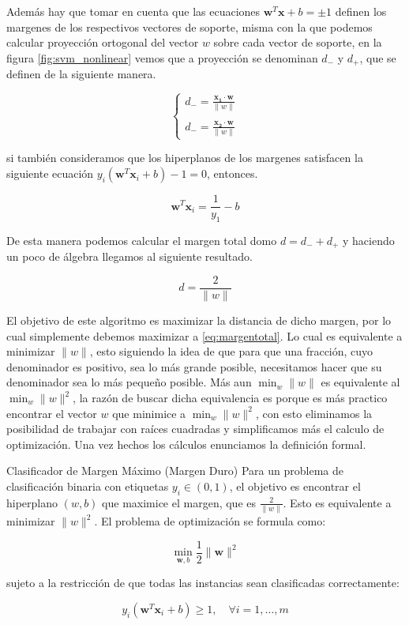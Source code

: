 Además hay que tomar en cuenta que las ecuaciones $\mathbf{w}^T \mathbf{x} + b=\pm 1$ definen los margenes de los respectivos vectores de soporte, misma con la que podemos calcular proyección ortogonal del vector $w$ sobre cada vector de soporte, en la figura \ref{fig:svm_nonlinear} vemos que a proyección se denominan $d_{-}$ y $d_{+}$, que se definen de la siguiente manera.


\begin{equation} \label{eq:proyeccion_ortogonal}
	\begin{cases}
		d_-=\frac{\mathbf{x_1} \cdot \mathbf{w}}{\|w\|} \\
		\\
		d_-=\frac{\mathbf{x_2} \cdot \mathbf{w}}{\|w\|}
	\end{cases}
\end{equation}

si también consideramos que los hiperplanos de los margenes satisfacen la siguiente ecuación $y_i(\mathbf{w}^T \mathbf{x}_i + b) - 1=0$, entonces.

\[\mathbf{w}^T \mathbf{x}_i =\frac{1}{y_1}-b\]

De esta manera podemos calcular el margen total domo $d=d_-+d_+$ y haciendo un poco de álgebra llegamos al siguiente resultado.

\begin{equation} \label{eq:margentotal}
	d=\frac{2}{\|w\|}
\end{equation}

El objetivo de este algoritmo es maximizar la distancia de dicho margen, por lo cual simplemente debemos maximizar a \eqref{eq:margentotal}. Lo cual es equivalente a minimizar $\|w\|$, esto siguiendo la idea de que para que una fracción, cuyo denominador es positivo, sea lo más grande posible, necesitamos hacer que su denominador sea lo más pequeño posible. Más aun $\min_{w}\|w\|$ es equivalente al $\min_{w}\|w\|^2$, la razón de buscar dicha equivalencia es porque es más practico encontrar el vector $w$ que minimice a  $\min_{w}\|w\|^2$, con esto eliminamos la posibilidad de trabajar con raíces cuadradas y simplificamos más el calculo de optimización. Una vez hechos los cálculos enunciamos la definición formal. 

\begin{definicion}{Clasificador de Margen Máximo (Margen Duro)}
	Para un problema de clasificación binaria con etiquetas $y_i\in(0,1)$, el objetivo es encontrar el hiperplano $(w,b)$ que maximice el margen, que es $\frac{2}{\|w\|}$. Esto es equivalente a minimizar $\|w\|^2$. El problema de optimización se formula como:
	
	\begin{equation}
		\min_{\mathbf{w}, b} \frac{1}{2} \|\mathbf{w}\|^2
	\end{equation}
	
	sujeto a la restricción de que todas las instancias sean clasificadas correctamente:
	
	\begin{equation}
		y_i(\mathbf{w}^T \mathbf{x}_i + b) \ge 1, \quad \forall i=1, \dots, m
	\end{equation}
\end{definicion}

